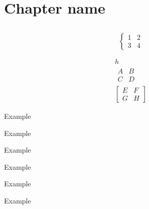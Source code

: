 \setcounter{chapter}{0-1}

\chapter{Chapter name}



\section{}

\subsection{}

\secdiv

\subsecdiv

\begin{equation*}
    \begin{cases}
        1 & 2 \\
        3 & 4
    \end{cases}
\end{equation*}

\begin{equation}
    \begin{gathered}
        h \\
        \begin{matrix}
            A & B \\
            C & D
        \end{matrix} \\
        \begin{bmatrix}
            E & F \\
            G & H
        \end{bmatrix}
    \end{gathered}
\end{equation}

\begin{concept}
    Example
\end{concept}

\begin{notation}
    
\end{notation}

\begin{definition}
    Example
\end{definition}


\begin{proposition}
    Example
\end{proposition}

\begin{theorem}
    Example
\end{theorem}

\begin{clarification}
    Example
\end{clarification}

\begin{exercise}
    Example
\end{exercise}